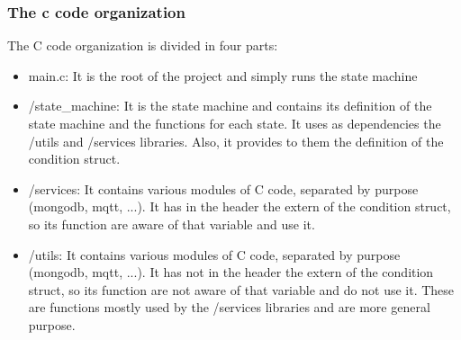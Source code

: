 \subsubsection{The c code organization}

The C code organization is divided in four parts:

\begin{itemize}
    \item main.c: It is the root of the project and simply runs the state machine
    \item /state\_machine: It is the state machine and contains its definition of the state machine and the functions for each state. It uses as dependencies the /utils and /services libraries. Also, it provides to them the definition of the condition struct.
    \item /services: It contains various modules of C code, separated by purpose (mongodb, mqtt, ...). It has in the header the extern of the condition struct, so its function are aware of that variable and use it.
    \item /utils: It contains various modules of C code, separated by purpose (mongodb, mqtt, ...). It has not in the header the extern of the condition struct, so its function are not aware of that variable and do not use it. These are functions mostly used by the /services libraries and are more general purpose.
\end{itemize}

